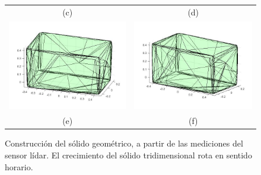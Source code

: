 \begin{figure}[ht!]
\begin{tabular}{cc}
        (c)&(d)\\
        \includegraphics[width=.50\textwidth]{images/5.jpg}&
        \includegraphics[width=.50\textwidth]{images/6.jpg}\\
        (e)&(f)
    \end{tabular}
  \captionsetup{font=footnotesize}
    \caption{\label{fig:Caja3D}Construcción del sólido geométrico, a partir de 
    las mediciones del sensor lídar. El crecimiento del sólido tridimensional 
    rota en sentido horario.}
\end{figure}


